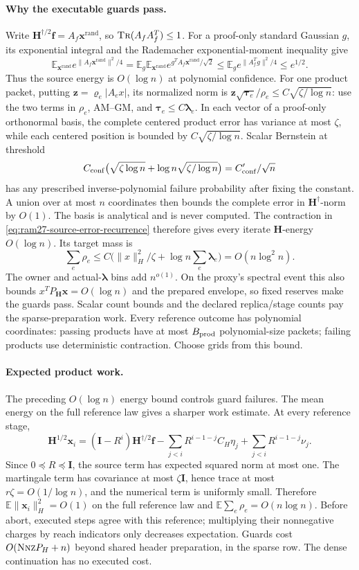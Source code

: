 \documentclass[11pt]{article}
\theoremstyle{remark}
\newcommand{\II}{\mathbf I}
\newcommand{\HH}{\mathbf H}
\newcommand{\ff}{\mathbf f}
\newcommand{\llambda}{\boldsymbol{\lambda}}
\newcommand{\ttau}{\boldsymbol{\tau}}
\newcommand{\zz}{\mathbf z}
\newcommand{\vvr}{\boldsymbol{\varrho}}
\newcommand{\xxrand}{\mathbf{x}^{\mathrm{rand}}}
\newcommand{\xx}{\mathbf x}
\newcommand{\Ex}{\mathbb E}
\newcommand{\nnz}{\textsc{Nnz}}
\newcommand{\norm}[1]{\lVert#1\rVert}
\newcommand{\tr}{\textsc{Tr}}
\begin{document}
\paragraph{Why the executable guards pass.}
Write $\HH^{\dagger/2}\ff=A_f\xxrand$, so $\tr(A_fA_f^T)\le1$.
For a proof-only standard Gaussian $g$, its exponential integral and the
Rademacher exponential-moment inequality give
\[
 \Ex_{\xxrand} e^{\norm{A_f\xxrand}^2/4}
 =\Ex_g\Ex_{\xxrand} e^{g^TA_f\xxrand/\sqrt2}
 \le\Ex_g e^{\norm{A_f^Tg}^2/4}\le e^{1/2}.
\]
Thus the source energy is $O(\log n)$ at polynomial confidence.
For one product packet, putting $\zz=\vvr_e|A_ex|$, its normalized norm is
$\zz\sqrt{\ttau_e}/\rho_e\le C\sqrt{\zeta/\log n}$: use the two terms in $\rho_e$,
AM--GM, and $\ttau_e\le C\llambda_e$.
In each vector of a proof-only orthonormal basis, the complete centered product
error has variance at most $\zeta$, while each centered position is bounded by
$C\sqrt{\zeta/\log n}$.
Scalar Bernstein at threshold
\[
 C_{\rm conf}\bigl(\sqrt{\zeta \log n}
             +\log n\sqrt{\zeta/\log n}\bigr)
                    =C'_{\rm conf}/\sqrt n
\]
has any prescribed inverse-polynomial failure probability after fixing the
constant.
A union over at most $n$ coordinates then bounds the complete error in
$\HH^\dagger$-norm by $O(1)$.
The basis is analytical and is never computed.
The contraction in \eqref{eq:ram27-source-error-recurrence} therefore gives
every iterate $\HH$-energy $O(\log n)$.
Its target mass is
\[
 \sum_e\rho_e\le C\bigl(\norm{x}_H^2/\zeta+\log n\sum_e\llambda_e\bigr)
                         =O(n\log^2 n).
\]
The owner and actual-$\llambda$ bins add $n^{o(1)}$.
On the proxy's spectral event this also bounds $x^TP_{\HH}\xx=O(\log n)$ and the prepared
envelope, so fixed reserves make the guards pass.
Scalar count bounds and the declared replica/stage counts pay the
sparse-preparation work.
Every reference outcome has polynomial coordinates: passing products have at
most $B_{\rm prod}$ polynomial-size packets; failing products use deterministic
contraction.
Choose grids from this bound.

\paragraph{Expected product work.}
The preceding $O(\log n)$ energy bound controls guard failures.
The mean energy on the full reference law gives a sharper work estimate.
At every reference stage,
\[
 \HH^{1/2}\xx_i=(\II-R^i)\HH^{\dagger/2}\ff
        -\sum_{j<i}R^{i-1-j}C_H\eta_j
        +\sum_{j<i}R^{i-1-j}\nu_j .
\]
Since $0\preceq R\preceq \II$, the source term has expected squared norm at most
one.
The martingale term has covariance at most $\zeta \II$, hence trace at most
$r\zeta=O(1/\log n)$, and the numerical term is uniformly small.
Therefore $\Ex\norm{\xx_i}_H^2=O(1)$ on the full reference law and
$\Ex\sum_e\rho_e=O(n\log n)$.
Before abort, executed steps agree with this reference; multiplying their
nonnegative charges by reach indicators only decreases expectation.
Guards cost $O(\nnz P_H+n)$ beyond shared header preparation, in the sparse row.
The dense continuation has no executed cost.
\end{document}
